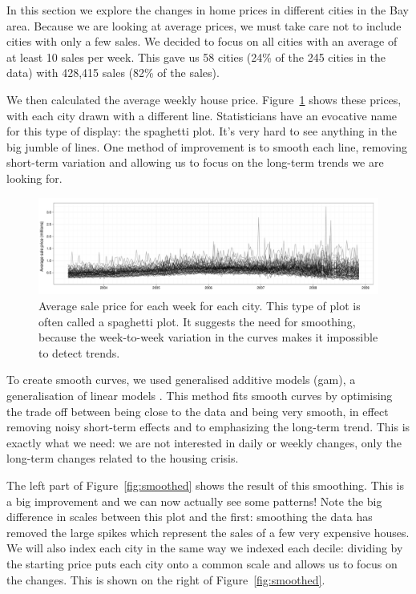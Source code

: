 \documentclass[oneside]{article}
\begin{document}
In this section we explore the changes in home prices in different cities in the Bay area.  Because we are looking at average prices, we must take care not to include cities with only a few sales. We decided to focus on all cities with an average of at least 10 sales per week. This gave us 58 cities (24\% of the 245 cities in the data) with 428,415 sales (82\% of the sales).  

We then calculated the average weekly house price. Figure~\ref{fig:spaghetti} shows these prices, with each city drawn with a different line.  Statisticians have an evocative name for this type of display: the spaghetti plot.  It's very hard to see anything in the big jumble of lines.  One method of improvement is to smooth each line, removing short-term variation and allowing us to focus on the long-term trends we are looking for.

\begin{figure}[htbp]
  \centering
    \includegraphics[width=0.9\linewidth]{cities-price}
  \caption{Average sale price for each week for each city.  This type of plot is often called a spaghetti plot.  It suggests the need for smoothing, because the week-to-week variation in the curves makes it impossible to detect trends.}
  \label{fig:spaghetti}
\end{figure}

To create smooth curves, we used generalised additive models ({\sc gam}), a generalisation of linear models \citep{wood:2006}.  This method fits smooth curves by optimising the trade off between being close to the data and being very smooth, in effect removing noisy short-term effects and to emphasizing the long-term trend.  This is exactly what we need: we are not interested in daily or weekly changes, only the long-term changes related to the housing crisis.

The left part of Figure~\ref{fig:smoothed} shows the result of this smoothing. This is a big improvement and we can now actually see some patterns! Note the big difference in scales between this plot and the first: smoothing the data has removed the large spikes which represent the sales of a few very expensive houses. We will also index each city in the same way we indexed each decile: dividing by the starting price puts each city onto a common scale and allows us to focus on the changes.  This is shown on the right of Figure~\ref{fig:smoothed}.  
\end{document}
